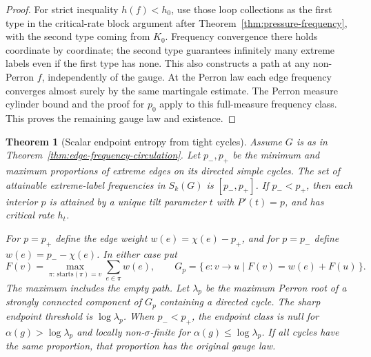 \documentclass[11pt]{article}
\newtheorem{theorem}{Theorem}
\theoremstyle{definition}
\theoremstyle{remark}
\begin{document}
\begin{proof}
For strict inequality $h(f)<h_0$, use those loop collections
as the first type in the critical-rate block argument after
Theorem~\ref{thm:pressure-frequency}, with the second type
coming from $K_0$. Frequency convergence there holds coordinate
by coordinate; the second type guarantees infinitely many
extreme labels even if the first type has none. This also
constructs a path at any non-Perron $f$, independently of the
gauge. At the Perron law each edge frequency converges almost
surely by the same martingale estimate. The Perron measure
cylinder bound and the proof for $p_0$ apply to this full-measure
frequency class. This proves the remaining gauge law and
existence.
\end{proof}

\begin{theorem}[Scalar endpoint entropy from tight cycles]
\label{thm:frequency-endpoints}
Assume $G$ is as in Theorem~\ref{thm:edge-frequency-circulation}.
Let $p_-,p_+$ be the minimum and maximum proportions of extreme
edges on its directed simple cycles. The set of attainable
extreme-label frequencies in $S_k(G)$ is $[p_-,p_+]$.
If $p_-<p_+$, then each interior $p$ is attained by a unique
tilt parameter $t$ with $P'(t)=p$, and has critical rate $h_t$.

For $p=p_+$ define the edge weight $w(e)=\chi(e)-p_+$, and for
$p=p_-$ define $w(e)=p_- -\chi(e)$. In either case put
\[
 F(v)=\max_{\pi:\,\mathrm{starts}(\pi)=v}\sum_{e\in\pi} w(e),
 \qquad
 G_p=\{\,e:v\to u\mid F(v)=w(e)+F(u)\,\}.
\]
The maximum includes the empty path. Let $\lambda_p$ be the maximum
Perron root of a strongly connected component of $G_p$ containing
a directed cycle. The sharp endpoint threshold is $\log\lambda_p$.
When $p_-<p_+$, the endpoint class is null for
$\alpha(g)>\log\lambda_p$ and locally non-$\sigma$-finite for
$\alpha(g)\le \log\lambda_p$. If all cycles have the same
proportion, that proportion has the original gauge law.
\end{theorem}
\end{document}
